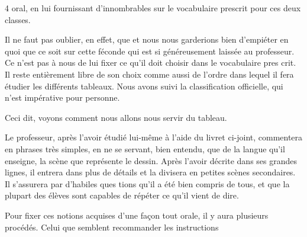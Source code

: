 \begin{VUpage}[6]{4}
\VUcontinue
oral, en lui fournissant d'innombrables \nl
{} sur le vocabulaire prescrit\nl
pour ces deux classes.

\VUblancAlinea
Il ne faut pas oublier, en effet, que \nl
{}\nl
{} et nous nous garderions bien\nl
d'empiéter en quoi que ce soit sur cette \cc
{} féconde qui est si généreusement laissée\nl
au professeur. Ce n'est pas à nous de lui fixer\nl
ce qu'il doit choisir dans le vocabulaire pres\cc
crit. Il reste entièrement libre de son choix\nl
comme aussi de l'ordre dans lequel il fera\nl
étudier les différents tableaux. Nous avons suivi\nl
la classification officielle, qui n'est impérative\nl
pour personne.

\VUblancAlinea
Ceci dit, voyons comment nous allons nous\nl
servir du tableau.

\VUblancAlinea
Le professeur, après l'avoir étudié lui-même\nl
à l'aide du livret ci-joint, commentera en\nl
phrases très simples, en ne se servant, bien\nl
entendu, que de la langue qu'il enseigne, la\nl
scène que représente le dessin. Après l'avoir\nl
décrite dans ses grandes lignes, il entrera dans\nl
plus de détails et la divisera en petites scènes\nl
secondaires. Il s'assurera par d'habiles ques\cc
tions qu'il a été bien compris de tous, et que\nl
la plupart des élèves sont capables de répéter\nl
ce qu'il vient de dire.

\VUblancAlinea
Pour fixer ces notions acquises d'une façon\nl
tout orale, il y aura plusieurs procédés. Celui\nl
que semblent recommander les instructions
\parplein
\end{VUpage}

